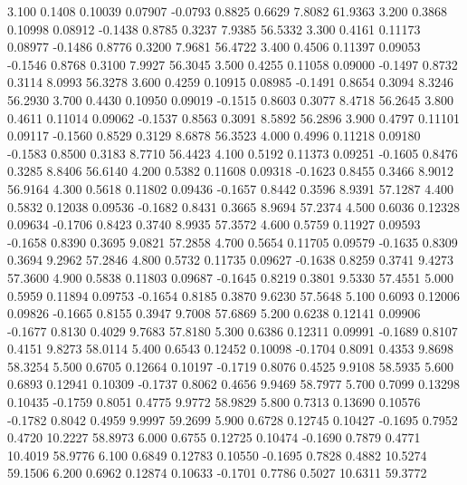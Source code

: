    3.100   0.1408   0.10039   0.07907  -0.0793   0.8825   0.6629   7.8082  61.9363
   3.200   0.3868   0.10998   0.08912  -0.1438   0.8785   0.3237   7.9385  56.5332
   3.300   0.4161   0.11173   0.08977  -0.1486   0.8776   0.3200   7.9681  56.4722
   3.400   0.4506   0.11397   0.09053  -0.1546   0.8768   0.3100   7.9927  56.3045
   3.500   0.4255   0.11058   0.09000  -0.1497   0.8732   0.3114   8.0993  56.3278
   3.600   0.4259   0.10915   0.08985  -0.1491   0.8654   0.3094   8.3246  56.2930
   3.700   0.4430   0.10950   0.09019  -0.1515   0.8603   0.3077   8.4718  56.2645
   3.800   0.4611   0.11014   0.09062  -0.1537   0.8563   0.3091   8.5892  56.2896
   3.900   0.4797   0.11101   0.09117  -0.1560   0.8529   0.3129   8.6878  56.3523
   4.000   0.4996   0.11218   0.09180  -0.1583   0.8500   0.3183   8.7710  56.4423
   4.100   0.5192   0.11373   0.09251  -0.1605   0.8476   0.3285   8.8406  56.6140
   4.200   0.5382   0.11608   0.09318  -0.1623   0.8455   0.3466   8.9012  56.9164
   4.300   0.5618   0.11802   0.09436  -0.1657   0.8442   0.3596   8.9391  57.1287
   4.400   0.5832   0.12038   0.09536  -0.1682   0.8431   0.3665   8.9694  57.2374
   4.500   0.6036   0.12328   0.09634  -0.1706   0.8423   0.3740   8.9935  57.3572
   4.600   0.5759   0.11927   0.09593  -0.1658   0.8390   0.3695   9.0821  57.2858
   4.700   0.5654   0.11705   0.09579  -0.1635   0.8309   0.3694   9.2962  57.2846
   4.800   0.5732   0.11735   0.09627  -0.1638   0.8259   0.3741   9.4273  57.3600
   4.900   0.5838   0.11803   0.09687  -0.1645   0.8219   0.3801   9.5330  57.4551
   5.000   0.5959   0.11894   0.09753  -0.1654   0.8185   0.3870   9.6230  57.5648
   5.100   0.6093   0.12006   0.09826  -0.1665   0.8155   0.3947   9.7008  57.6869
   5.200   0.6238   0.12141   0.09906  -0.1677   0.8130   0.4029   9.7683  57.8180
   5.300   0.6386   0.12311   0.09991  -0.1689   0.8107   0.4151   9.8273  58.0114
   5.400   0.6543   0.12452   0.10098  -0.1704   0.8091   0.4353   9.8698  58.3254
   5.500   0.6705   0.12664   0.10197  -0.1719   0.8076   0.4525   9.9108  58.5935
   5.600   0.6893   0.12941   0.10309  -0.1737   0.8062   0.4656   9.9469  58.7977
   5.700   0.7099   0.13298   0.10435  -0.1759   0.8051   0.4775   9.9772  58.9829
   5.800   0.7313   0.13690   0.10576  -0.1782   0.8042   0.4959   9.9997  59.2699
   5.900   0.6728   0.12745   0.10427  -0.1695   0.7952   0.4720  10.2227  58.8973
   6.000   0.6755   0.12725   0.10474  -0.1690   0.7879   0.4771  10.4019  58.9776
   6.100   0.6849   0.12783   0.10550  -0.1695   0.7828   0.4882  10.5274  59.1506
   6.200   0.6962   0.12874   0.10633  -0.1701   0.7786   0.5027  10.6311  59.3772
